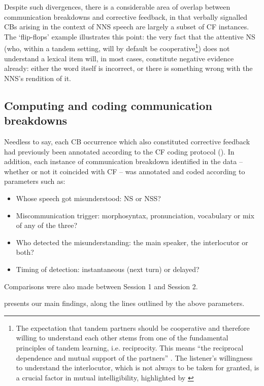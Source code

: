 \documentclass[output=paper,colorlinks,citecolor=brown,modfonts,nonflat]{../langscibook}
\begin{document}
Despite such divergences, there is a considerable area of overlap between communication breakdowns and corrective feedback, in that verbally signalled CBs arising in the context of NNS speech are largely a subset of CF instances. The ‘flip-flops’ example  illustrates this point: the very fact that the attentive NS (who, within a tandem setting, will by default be cooperative\footnote{ {The expectation that tandem partners should be cooperative and therefore willing to understand each other stems from one of the fundamental principles of tandem learning, i.e. reciprocity. This means “the reciprocal dependence and mutual support of the partners” \citep[11]{Brammerts1996}. The listener’s willingness to understand the interlocutor, which is not always to be taken for granted, is a crucial factor in mutual intelligibility, highlighted by \citet[4]{ChambersTrudgill1998}}}) does not understand a lexical item will, in most cases, constitute negative evidence already: either the word itself is incorrect, or there is something wrong with the NNS’s rendition of it.

\subsection{Computing and coding communication breakdowns}\label{sec:scheuer:5.2}

Needless to say, each CB occurrence which also constituted corrective feedback had previously been annotated according to the CF coding protocol (). In addition, each instance of communication breakdown identified in the data – whether or not it coincided with CF – was annotated and coded according to parameters such as:

\begin{itemize}
\item Whose speech got misunderstood: NS or NSS?
\item Miscommunication trigger: morphosyntax, pronunciation, vocabulary or mix of any of the three?
\item Who detected the misunderstanding: the main speaker, the interlocutor or both?
\item Timing of detection: instantaneous (next turn) or delayed?
\end{itemize}

Comparisons were also made between Session 1 and Session 2.

   presents our main findings, along the lines outlined by the above parameters.
\end{document}
